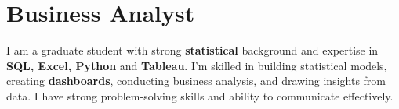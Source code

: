 
\section{Business Analyst}
\small{
    I am a graduate student with strong \textbf{statistical} background and expertise in \textbf{SQL, Excel, Python} and \textbf{Tableau}. I'm skilled in building statistical models, creating \textbf{dashboards}, conducting business analysis, and drawing insights from data. I have strong problem-solving skills and ability to communicate effectively.
}